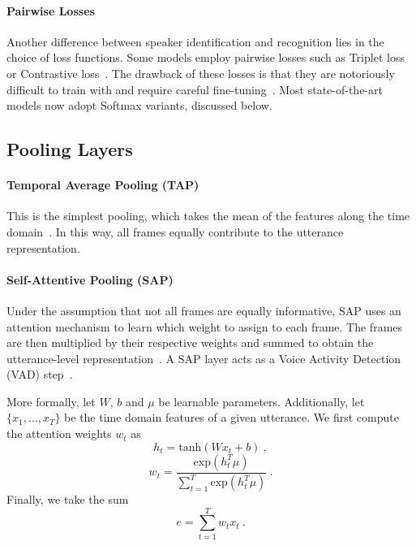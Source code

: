 \documentclass[conference]{IEEEtran}
\begin{document}
\paragraph{Pairwise Losses}Another difference between speaker identification and recognition lies in the choice of loss functions. Some models employ pairwise losses such as Triplet loss or Contrastive loss~\cite{cai2018exploring,chung2019delving}. The drawback of these losses is that they are notoriously difficult to train with and require careful fine-tuning~\cite{nagrani2020voxceleb}. Most state-of-the-art models now adopt Softmax variants, discussed below.

\subsection{Pooling Layers}

\paragraph{Temporal Average Pooling (TAP)}This is the simplest pooling, which takes the mean of the features along the time domain~\cite{cai2018exploring,chung2019delving}. In this way, all frames equally contribute to the utterance representation.

\paragraph{Self-Attentive Pooling (SAP)}Under the assumption that not all frames are equally informative, SAP uses an attention mechanism to learn which weight to assign to each frame. The frames are then multiplied by their respective weights and summed to obtain the utterance-level representation~\cite{cai2018exploring}. A SAP layer acts as a Voice Activity Detection (VAD) step~\cite{desplanques2020ecapa}.

More formally, let $W$, $b$ and $\mu$ be learnable parameters. Additionally, let $\{x_1,\dots,x_T\}$ be the time domain features of a given utterance. We first compute the attention weights $w_t$ as
\begin{equation}
    h_t = \text{tanh}(Wx_t + b)~,
\end{equation}
\begin{equation}
    w_t = \frac{\text{exp}(h_t^T\mu)}{\sum_{t=1}^T\text{exp}(h_t^T\mu)}~.
\end{equation}
Finally, we take the sum
\begin{equation}
    e = \sum_{t=1}^Tw_tx_t~.
\end{equation}
\end{document}
